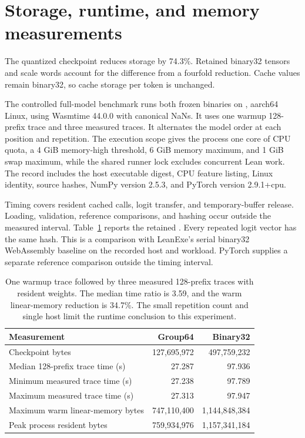 \section{Storage, runtime, and memory measurements}
\label{sec:runtime}

The quantized checkpoint reduces storage by 74.3\%.  Retained binary32 tensors and scale words account for the difference from a fourfold reduction.  Cache values remain binary32, so cache storage per token is unchanged.

The controlled full-model benchmark runs both frozen binaries on , aarch64 Linux, using Wasmtime 44.0.0 with canonical NaNs.  It uses one warmup 128-prefix trace and three measured traces.  It alternates the model order at each position and repetition.  The execution scope gives the process one core of CPU quota, a 4 GiB memory-high threshold, 6 GiB memory maximum, and 1 GiB swap maximum, while the shared runner lock excludes concurrent Lean work.  The record includes the host executable digest, CPU feature listing, Linux identity, source hashes, NumPy version 2.5.3, and PyTorch version 2.9.1+cpu.

Timing covers resident cached calls, logit transfer, and temporary-buffer release.  Loading, validation, reference comparisons, and hashing occur outside the measured interval.  Table~\ref{tab:runtime} reports the retained .  Every repeated logit vector has the same hash.  This is a comparison with LeanExe's serial binary32 WebAssembly baseline on the recorded host and workload.  PyTorch supplies a separate reference comparison outside the timing interval.

\begin{table}[ht]
\centering
\small
\begin{tabular}{lrr}
\toprule
Measurement & Group64 & Binary32\\
\midrule
Checkpoint bytes & 127,695,972 & 497,759,232\\
Median 128-prefix trace time (s) & 27.287 & 97.936\\
Minimum measured trace time (s) & 27.238 & 97.789\\
Maximum measured trace time (s) & 27.313 & 97.947\\
Maximum warm linear-memory bytes & 747,110,400 & 1,144,848,384\\
Peak process resident bytes & 759,934,976 & 1,157,341,184\\
\bottomrule
\end{tabular}
\caption{One warmup trace followed by three measured 128-prefix traces with resident weights.  The median time ratio is 3.59, and the warm linear-memory reduction is 34.7\%.  The small repetition count and single host limit the runtime conclusion to this experiment.}
\label{tab:runtime}
\end{table}

